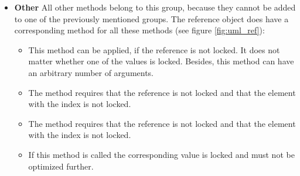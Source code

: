 \begin{itemize}
\begin{itemize}
\item{}
\item{}
\item{}
\item{}
\item{}
\end{itemize}

\item{\textbf{Other}} All other methods belong to this group, because they cannot be added to one of the previously mentioned groups. The reference object does have a corresponding method for all these methods (see figure \ref{fig:uml_ref}):

\begin{itemize}
\item{} This method can be applied, if the reference is not locked. It does not matter whether one of the values is locked. Besides, this method can have an arbitrary number of arguments.

\item{} The  method requires that the reference is not locked and that the element with the index  is not locked.

\item{} The  method requires that the reference is not locked and that the element with the index  is not locked.

\item{} If this method is called the corresponding value is locked and must not be optimized further.

\end{itemize}
\end{itemize}

